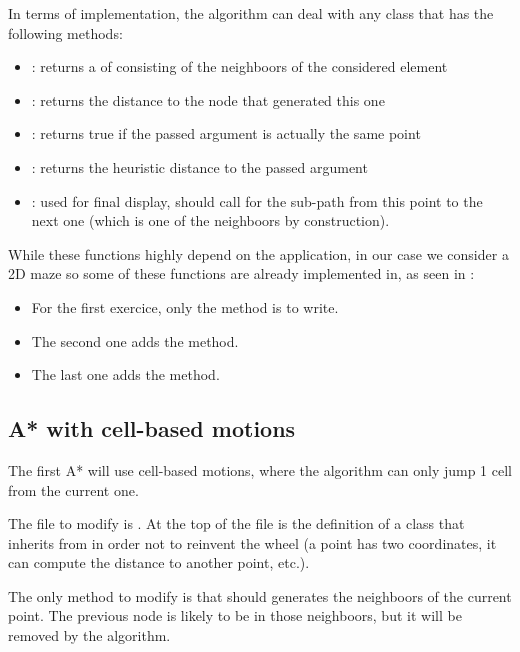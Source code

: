 \documentclass{ecnreport}
\begin{document}
In terms of implementation, the algorithm can deal with any  class that has the following methods:
\begin{itemize}
 \item {}: returns a  of  consisting of the neighboors of the considered
 element
 \item {}: returns the distance to the node that generated this one
 \item {}: returns true if the passed argument is actually the same point
 \item {}: returns the heuristic distance to the passed argument
 \item {}: used for final display, should call  for the sub-path from this point to the next one (which is one of the neighboors by construction).
\end{itemize}


While these functions highly depend on the application, in our case we consider a 2D maze so some of these functions are already implemented in, as seen in :
\begin{itemize}
 \item For the first exercice, only the  method is to write.
 \item The second one adds the  method.
 \item The last one adds the  method.
\end{itemize}



\subsection{A* with cell-based motions}

The first A* will use cell-based motions, where the algorithm can only jump 1 cell from the current one.

The file to modify is .
At the top of the file is the definition of a  class
that inherits from  in order not to reinvent the wheel (a point has two coordinates, it can compute the distance to
another point, etc.).

The only method to modify is  that should generates the neighboors of the current point.
The previous node is likely to be in those neighboors, but it will be removed by the algorithm.
\end{document}
